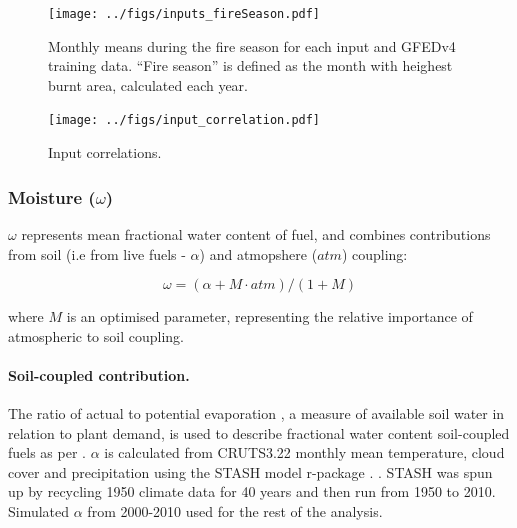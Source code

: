 \begin{figure}[!ht]
  \centering
    \texttt{[image: ../figs/inputs\_fireSeason.pdf]}
  \caption{Monthly means during the fire season for each input  and GFEDv4 training data. ``Fire season'' is defined as the month with heighest burnt area, calculated each year.}
  \label{fig:Season_mean_ins}
\end{figure}

\begin{figure}[!ht]
  \centering
    \texttt{[image: ../figs/input\_correlation.pdf]}
  \caption{Input correlations.}
  \label{fig:Corr_ins}
\end{figure}

\subsubsection{Moisture ($\omega$)}

$\omega$ represents mean fractional water content of fuel, and combines contributions from soil (i.e from live fuels - $\alpha$) and atmopshere ($atm$) coupling:

\begin{equation}
    \omega = (\alpha + M \cdot atm) / (1 + M)
\end{equation}

where $M$ is an optimised parameter, representing the relative importance of atmospheric to soil coupling.

\paragraph{Soil-coupled contribution.}
The ratio of actual to potential evaporation \citep[$\alpha$][]{prentice1993simulation}, a measure of available soil water in relation to plant demand, is used to describe fractional water content soil-coupled fuels as per \citet{harrison2010fire, bistinas2014causal}.
$\alpha$ is calculated from CRUTS3.22 monthly mean temperature, cloud cover and precipitation using the STASH model \citep{sykes1996bioclimatic} r-package \citep{rstash}. . STASH was spun up by recycling 1950 climate data for 40 years and then run from 1950 to 2010. Simulated $\alpha$ from 2000-2010 used for the rest of the analysis.

